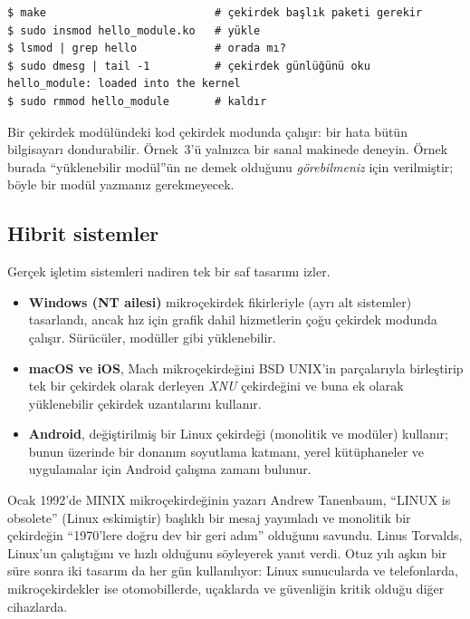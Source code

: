 

\begin{lstlisting}[style=term]
$ make                          # çekirdek başlık paketi gerekir
$ sudo insmod hello_module.ko   # yükle
$ lsmod | grep hello            # orada mı?
$ sudo dmesg | tail -1          # çekirdek günlüğünü oku
hello_module: loaded into the kernel
$ sudo rmmod hello_module       # kaldır
\end{lstlisting}

\begin{tryit}
Bir çekirdek modülündeki kod çekirdek modunda çalışır: bir hata bütün bilgisayarı dondurabilir. Örnek~3'ü yalnızca bir sanal makinede deneyin. Örnek burada ``yüklenebilir modül''ün ne demek olduğunu \emph{görebilmeniz} için verilmiştir; böyle bir modül yazmanız gerekmeyecek.
\end{tryit}

\subsection{Hibrit sistemler}

Gerçek işletim sistemleri nadiren tek bir saf tasarımı izler.

\begin{itemize}
  \item \textbf{Windows (NT ailesi)} mikroçekirdek fikirleriyle (ayrı alt sistemler) tasarlandı, ancak hız için grafik dahil hizmetlerin çoğu çekirdek modunda çalışır. Sürücüler, modüller gibi yüklenebilir.
  \item \textbf{macOS ve iOS}, Mach mikroçekirdeğini BSD UNIX'in parçalarıyla birleştirip tek bir çekirdek olarak derleyen \emph{XNU} çekirdeğini ve buna ek olarak yüklenebilir çekirdek uzantılarını kullanır.
  \item \textbf{Android}, değiştirilmiş bir Linux çekirdeği (monolitik ve modüler) kullanır; bunun üzerinde bir donanım soyutlama katmanı, yerel kütüphaneler ve uygulamalar için Android çalışma zamanı bulunur.
\end{itemize}

\begin{histnote}
Ocak 1992'de MINIX mikroçekirdeğinin yazarı Andrew Tanenbaum, ``LINUX is obsolete'' (Linux eskimiştir) başlıklı bir mesaj yayımladı ve monolitik bir çekirdeğin ``1970'lere doğru dev bir geri adım'' olduğunu savundu. Linus Torvalds, Linux'un çalıştığını ve hızlı olduğunu söyleyerek yanıt verdi. Otuz yılı aşkın bir süre sonra iki tasarım da her gün kullanılıyor: Linux sunucularda ve telefonlarda, mikroçekirdekler ise otomobillerde, uçaklarda ve güvenliğin kritik olduğu diğer cihazlarda.
\end{histnote}

